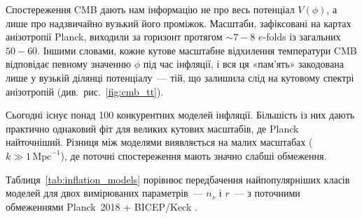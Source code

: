 Спостереження CMB дають нам інформацію не про весь потенціал
$V(\phi)$, а лише про надзвичайно вузький його проміжок. Масштаби,
зафіксовані на картах анізотропії Planck, виходили за горизонт
протягом $\sim\!7 - 8$ $e$-folds із загальних $50 - 60$. Іншими
словами, кожне кутове масштабне відхилення температури CMB
відповідає певному значенню $\phi$ під час інфляції, і вся ця
«пам'ять» закодована лише у вузькій ділянці потенціалу~---
тій, що залишила слід на кутовому спектрі анізотропій
(див.\ рис.~\ref{fig:cmb_tt}).


Сьогодні існує понад 100 конкурентних моделей інфляції.
Більшість із них дають практично однаковий фіт для великих
кутових масштабів, де Planck найточніший. Різниця між
моделями виявляється на малих масштабах
($k \gg 1\,\mathrm{Mpc}^{-1}$), де поточні спостереження
мають значно слабші обмеження.

Таблиця~\ref{tab:inflation_models} порівнює передбачення
найпопулярніших класів моделей для двох вимірюваних
параметрів~--- $n_s$ і $r$~--- з поточними обмеженнями
Planck~2018 \cite{planck_2018} + BICEP/Keck \cite{bicep_keck_2021}.

